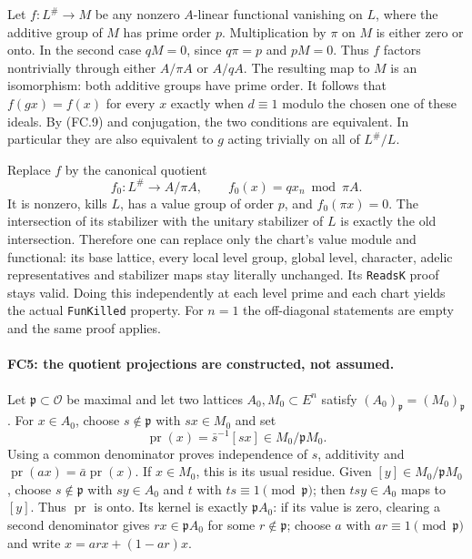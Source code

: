 Let $f:L^\#\to M$ be any nonzero $A$-linear functional vanishing on
$L$, where the additive group of $M$ has prime order $p$. Multiplication
by $\pi$ on $M$ is either zero or onto. In the second case
$qM=0$, since $q\pi=p$ and $pM=0$. Thus $f$ factors nontrivially
through either $A/\pi A$ or $A/qA$. The resulting map to $M$ is
an isomorphism: both additive groups have prime order. It follows that
$f(gx)=f(x)$ for every $x$ exactly when $d\equiv1$ modulo the
chosen one of these ideals. By (FC.9) and conjugation, the two conditions
are equivalent. In particular they are also equivalent to $g$ acting
trivially on all of $L^\#/L$.

Replace $f$ by the canonical quotient
\[
 f_0:L^\#\longrightarrow A/\pi A,\qquad
 f_0(x)=qx_n\bmod\pi A.                               \tag{FC.10}
\]
It is nonzero, kills $L$, has a value group of order $p$, and
$f_0(\pi x)=0$. The intersection of its stabilizer with the unitary
stabilizer of $L$ is exactly the old intersection. Therefore one can
replace only the chart's value module and functional: its base lattice,
every local level group, global level, character, adelic representatives
and stabilizer maps stay literally unchanged. Its \texttt{ReadsK}
proof stays valid. Doing this independently at each level prime and
each chart yields the actual \texttt{FunKilled} property. For $n=1$
the off-diagonal statements are empty and the same proof applies.

\paragraph{FC5: the quotient projections are constructed, not assumed.}
Let $\mathfrak p\subset\mathcal O$ be maximal and let two lattices
$A_0,M_0\subset E^n$ satisfy $(A_0)_{\mathfrak p}=(M_0)_{\mathfrak p}$.
For $x\in A_0$, choose $s\notin\mathfrak p$ with $sx\in M_0$ and set
\[
 \operatorname{pr}(x)=\bar s^{-1}[sx]
                 \in M_0/\mathfrak pM_0.              \tag{FC.11}
\]
Using a common denominator proves independence of $s$, additivity and
$\operatorname{pr}(ax)=\bar a\operatorname{pr}(x)$.
If $x\in M_0$, this is its usual residue. Given $[y]\in M_0/\mathfrak pM_0$,
choose $s\notin\mathfrak p$ with $sy\in A_0$ and $t$ with
$ts\equiv1\pmod{\mathfrak p}$; then $tsy\in A_0$ maps to $[y]$.
Thus $\operatorname{pr}$ is onto. Its kernel is exactly
$\mathfrak pA_0$: if its value is zero, clearing a second denominator
gives $rx\in\mathfrak pA_0$ for some $r\notin\mathfrak p$;
choose $a$ with $ar\equiv1\pmod{\mathfrak p}$ and write
$x=arx+(1-ar)x$.

